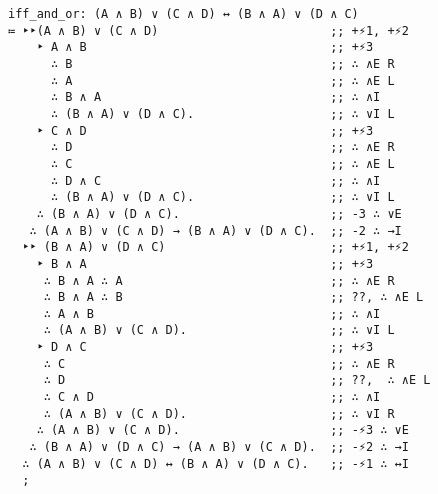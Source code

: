 \documentclass{article}
\begin{document}
\begin{Verbatim}
iff_and_or: (A ∧ B) ∨ (C ∧ D) ↔ (B ∧ A) ∨ (D ∧ C)
≔ ‣‣(A ∧ B) ∨ (C ∧ D)                        ;; +⚡1, +⚡2
    ‣ A ∧ B                                  ;; +⚡3
      ∴ B                                    ;; ∴ ∧E R
      ∴ A                                    ;; ∴ ∧E L
      ∴ B ∧ A                                ;; ∴ ∧I
      ∴ (B ∧ A) ∨ (D ∧ C).                   ;; ∴ ∨I L
    ‣ C ∧ D                                  ;; +⚡3
      ∴ D                                    ;; ∴ ∧E R
      ∴ C                                    ;; ∴ ∧E L
      ∴ D ∧ C                                ;; ∴ ∧I
      ∴ (B ∧ A) ∨ (D ∧ C).                   ;; ∴ ∨I L
    ∴ (B ∧ A) ∨ (D ∧ C).                     ;; -3 ∴ ∨E
   ∴ (A ∧ B) ∨ (C ∧ D) → (B ∧ A) ∨ (D ∧ C).  ;; -2 ∴ →I
  ‣‣ (B ∧ A) ∨ (D ∧ C)                       ;; +⚡1, +⚡2
    ‣ B ∧ A                                  ;; +⚡3
     ∴ B ∧ A ∴ A                             ;; ∴ ∧E R
     ∴ B ∧ A ∴ B                             ;; ??, ∴ ∧E L
     ∴ A ∧ B                                 ;; ∴ ∧I
     ∴ (A ∧ B) ∨ (C ∧ D).                    ;; ∴ ∨I L
    ‣ D ∧ C                                  ;; +⚡3
     ∴ C                                     ;; ∴ ∧E R
     ∴ D                                     ;; ??,  ∴ ∧E L
     ∴ C ∧ D                                 ;; ∴ ∧I
     ∴ (A ∧ B) ∨ (C ∧ D).                    ;; ∴ ∨I R
    ∴ (A ∧ B) ∨ (C ∧ D).                     ;; -⚡3 ∴ ∨E
   ∴ (B ∧ A) ∨ (D ∧ C) → (A ∧ B) ∨ (C ∧ D).  ;; -⚡2 ∴ →I
  ∴ (A ∧ B) ∨ (C ∧ D) ↔ (B ∧ A) ∨ (D ∧ C).   ;; -⚡1 ∴ ↔I
  ;
\end{Verbatim}
\end{document}
